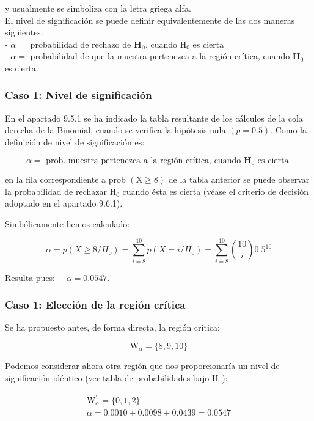 \documentclass[
]{article}
\begin{document}
y usualmente se simboliza con la letra griega alfa.\\
El nivel de significación se puede definir equivalentemente de las dos maneras siguientes:\\
- \(\alpha=\) probabilidad de rechazo de \(\mathbf{H}_{\mathbf{0}}\), cuando \(\mathrm{H}_{0}\) es cierta\\
- \(\alpha=\) probabilidad de que la muestra pertenezca a la región crítica, cuando \(\mathbf{H}_{0}\) es cierta.

\subsubsection{Caso 1: Nivel de significación}\label{caso-1-nivel-de-significaciuxf3n}

En el apartado 9.5.1 se ha indicado la tabla resultante de los cálculos de la cola derecha de la Binomial, cuando se verifica la hipótesis nula \((p=0.5)\). Como la definición de nivel de significación es:

\[
\alpha=\text { prob. muestra pertenezca a la región crítica, cuando } \mathbf{H}_{0} \text { es cierta }
\]

en la fila correspondiente a prob \((\mathrm{X} \geq 8)\) de la tabla anterior se puede observar la probabilidad de rechazar \(\mathrm{H}_{0}\) cuando ésta es cierta (véase el criterio de decisión adoptado en el apartado 9.6.1).

Simbólicamente hemos calculado:

\[
\alpha=p\left(X \geq 8 / H_{0}\right)=\sum_{i=8}^{10} p\left(X=i / H_{0}\right)=\sum_{i=8}^{10}\binom{10}{i} 0.5^{10}
\]

Resulta pues: \(\quad \alpha=0.0547\).

\subsubsection{Caso 1: Elección de la región crítica}\label{caso-1-elecciuxf3n-de-la-regiuxf3n-cruxedtica}

Se ha propuesto antes, de forma directa, la región crítica:

\[
\mathrm{W}_{\alpha}=\{8,9,10\}
\]

Podemos considerar ahora otra región que nos proporcionaría un nivel de significación idéntico (ver tabla de probabilidades bajo \(\mathrm{H}_{0}\)):

\[
\begin{gathered}
\mathrm{W}_{\alpha}^{\prime}=\{0,1,2\} \\
\alpha=0.0010+0.0098+0.0439=0.0547
\end{gathered}
\]
\end{document}
